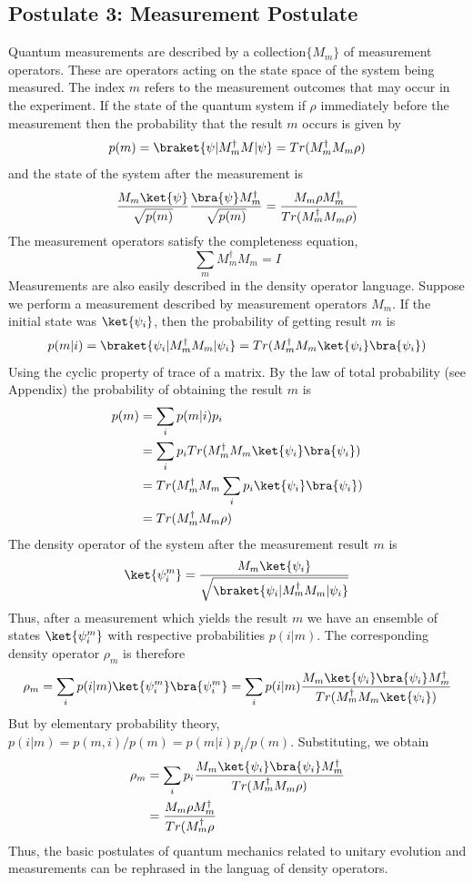 \documentclass[12pt, oneside]{book}
\theoremstyle{definition}
\theoremstyle{definition}
\theoremstyle{remark}
\begin{document}
\subsection{Postulate 3: Measurement Postulate}
Quantum measurements are described by a collection$\{M_m\}$ of measurement operators. These are operators acting on the state space of the system being measured. The index $m$ refers to the measurement outcomes that may occur in the experiment. If the state of the quantum system if $\rho$ immediately before the measurement then the probability that the result $m$ occurs is given by
\[
p(m)=\braket{\psi|M_m^{\dagger}M|\psi}=Tr(M_m^{\dagger}M_m\rho)
\]
and the state of the system after the measurement is 
\[
\frac{M_m\ket{\psi}}{\sqrt{p(m)}}\frac{\bra{\psi}M_m^{\dagger}}{\sqrt{p(m)}}=\frac{M_m\rho M_m^{\dagger}}{Tr(M_m^{\dagger}M_m\rho)}
\]
The measurement operators satisfy the completeness equation,
\[
\sum_mM_m^{\dagger}M_m=I
\]
Measurements are also easily described in the density operator language. Suppose we perform a measurement described by measurement operators $M_m$. If the initial state was $\ket{\psi_i}$, then the probability of getting result $m$ is
\[
p(m|i)=\braket{\psi_i|M_m^{\dagger}M_m|\psi_i}=Tr(M_m^{\dagger}M_m\ket{\psi_i}\bra{\psi_i})
\]
Using the cyclic property of trace of a matrix. By the law of total probability (see Appendix) the probability of obtaining the result $m$ is 
\begin{align*}
p(m)&=\sum_ip(m|i)p_i\\
&=\sum_ip_iTr(M_m^{\dagger}M_m\ket{\psi_i}\bra{\psi_i})\\
&=Tr(M_m^{\dagger}M_m\sum_ip_i\ket{\psi_i}\bra{\psi_i})\\
&=Tr(M_m^{\dagger}M_m\rho)
\end{align*}
The density operator of the system after the measurement result $m$ is 
\[
\ket{\psi_i^m}=\frac{M_m\ket{\psi_i}}{\sqrt{\braket{\psi_i|M_m^{\dagger}M_m|\psi_i}}}
\]
Thus, after a measurement which yields the result $m$ we have an ensemble of states $\ket{\psi_i^m}$ with respective probabilities $p(i|m)$. The corresponding density operator $\rho_m$ is therefore
\[
\rho_m=\sum_ip(i|m)\ket{\psi_i^m}\bra{\psi_i^m}=\sum_ip(i|m)\frac{M_m\ket{\psi_i}\bra{\psi_i}M_m^{\dagger}}{Tr(M_m^{\dagger}M_m\ket{\psi_i})}
\]
But by elementary probability theory, $p(i|m)=p(m,i)/p(m)=p(m|i)p_i/p(m)$. Substituting, we obtain
\begin{align*}
\rho_m&=\sum_ip_i\frac{M_m\ket{\psi_i}\bra{\psi_i}M_m^{\dagger}}{Tr(M_m^{\dagger}M_m\rho)}\\
&=\frac{M_m\rho M_m^{\dagger}}{Tr(M_m^{\dagger}\rho}
\end{align*}
Thus, the basic postulates of quantum mechanics related to unitary evolution and measurements can be rephrased in the languag of density operators.
\end{document}
